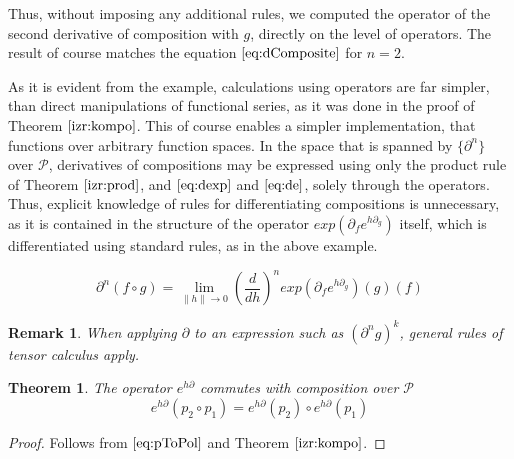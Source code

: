 \documentclass{article}
\newcommand{\dP}{\mathcal{P}}
\newcommand{\D}{\partial}
\newtheorem{izrek}{Theorem}[section]
\newtheorem{opomba}{Remark}[section]
\begin{document}
 Thus, without imposing any additional rules, we computed the operator of the second derivative of composition with $g$, directly on the level of operators. The result of course matches the equation $\eqref{eq:dComposite}$ for $n=2$.
 
 As it is evident from the example, calculations using operators are far simpler, than direct manipulations of functional series, as it was done in the proof of Theorem $\ref{izr:kompo}$. This of course enables a simpler implementation, that functions over arbitrary function spaces. In the space that is spanned by $\{\D^n\}$ over $\dP$, derivatives of compositions may be expressed using only the product rule of Theorem $\ref{izr:prod}$, and $\eqref{eq:dexp}$ and $\eqref{eq:de}$, solely through the operators. Thus, explicit knowledge of rules for differentiating compositions is unnecessary, as it is contained in the structure of the operator $exp(\D_fe^{h\D_g})$ itself, which is differentiated using standard rules, as in the above example.
 
 \begin{equation}\label{eq:dkompo}
 \D^n(f\circ g)=\lim\limits_{\lVert h\rVert\to 0}(\frac{d}{dh})^nexp(\D_fe^{h\D_g})(g)(f)
 \end{equation}
 
 \begin{opomba}
 When applying $\D$ to an expression such as $(\D^n g)^k$, general rules of tensor calculus apply. 
 \end{opomba}
 
   \begin{izrek}\label{izr:komp_homo}
   The operator $e^{h\D}$ commutes with composition over $\dP$
   \begin{equation}
   e^{h\D}(p_2\circ p_1)=e^{h\D}(p_2)\circ e^{h\D}(p_1)
   \end{equation}
   \end{izrek}
   
   \begin{proof}
   Follows from $\eqref{eq:pToPol}$ and Theorem $\ref{izr:kompo}$.
   \end{proof}
 
\end{document}
